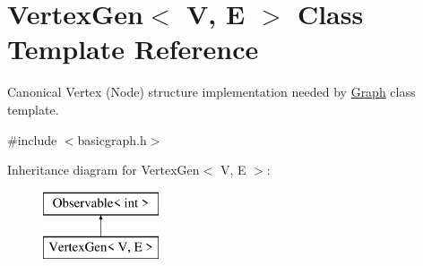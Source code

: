 \hypertarget{classVertexGen}{}\section{Vertex\+Gen$<$ V, E $>$ Class Template Reference}
\label{classVertexGen}


Canonical Vertex (Node) structure implementation needed by \mbox{\hyperlink{classGraph}{Graph}} class template.  




{\ttfamily \#include $<$basicgraph.\+h$>$}

Inheritance diagram for Vertex\+Gen$<$ V, E $>$\+:\begin{figure}[H]
\begin{center}
\leavevmode
\includegraphics[height=2.000000cm]{classVertexGen}
\end{center}
\end{figure}
